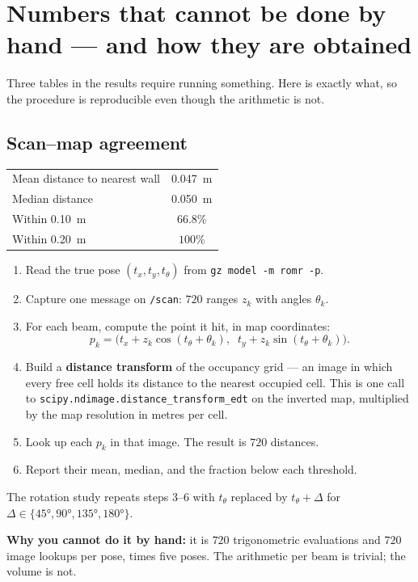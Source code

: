\documentclass[11pt,a4paper]{report}
\newcommand{\term}[1]{\textcolor{rust}{\textbf{#1}}}
\newcommand{\file}[1]{\texttt{\small #1}}
\begin{document}
\section{Numbers that cannot be done by hand --- and how they are obtained}

Three tables in the results require running something. Here is exactly what,
so the procedure is reproducible even though the arithmetic is not.

\subsection{Scan--map agreement}

\begin{center}
\begin{tabular}{@{}lc@{}}
\toprule
Mean distance to nearest wall & \SI{0.047}{\metre} \\
Median distance & \SI{0.050}{\metre} \\
Within \SI{0.10}{\metre} & $66.8\%$ \\
Within \SI{0.20}{\metre} & $100\%$ \\
\bottomrule
\end{tabular}
\end{center}

\begin{plain}[Procedure]
\begin{enumerate}[leftmargin=1.6em,itemsep=2pt]
\item Read the true pose $(t_x, t_y, t_\theta)$ from \file{gz model -m romr -p}.
\item Capture one message on \file{/scan}: $720$ ranges $z_k$ with angles
$\theta_k$.
\item For each beam, compute the point it hit, in map coordinates:
\[
p_k = \bigl(t_x + z_k \cos(t_\theta + \theta_k),\;\;
            t_y + z_k \sin(t_\theta + \theta_k)\bigr).
\]
\item Build a \term{distance transform} of the occupancy grid --- an image in
which every free cell holds its distance to the nearest occupied cell. This is
one call to \file{scipy.ndimage.distance\_transform\_edt} on the inverted map,
multiplied by the map resolution in metres per cell.
\item Look up each $p_k$ in that image. The result is $720$ distances.
\item Report their mean, median, and the fraction below each threshold.
\end{enumerate}
The rotation study repeats steps 3--6 with $t_\theta$ replaced by
$t_\theta + \Delta$ for $\Delta \in \{\ang{45}, \ang{90}, \ang{135}, \ang{180}\}$.

\smallskip
\textbf{Why you cannot do it by hand:} it is $720$ trigonometric evaluations
and $720$ image lookups per pose, times five poses. The arithmetic per beam is
trivial; the volume is not.
\end{plain}
\end{document}
